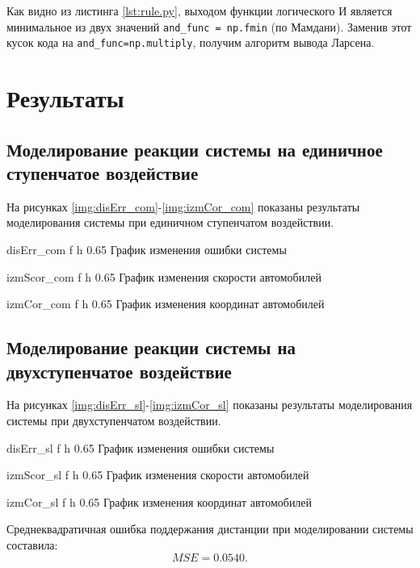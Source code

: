 Как видно из листинга \ref{lst:rule.py}, выходом функции логического И является 
минимальное из двух значений \lstinline|and_func = np.fmin| (по Мамдани).
Заменив этот кусок кода на \lstinline|and_func=np.multiply|, получим алгоритм вывода
Ларсена.

\section{Результаты}

\subsection{Моделирование реакции системы на единичное ступенчатое
 воздействие}

На рисунках \ref{img:disErr_com}-\ref{img:izmCor_com} показаны результаты
 моделирования системы при единичном ступенчатом воздействии.

        {disErr_com}
        {f}
        {h}
        {0.65\textwidth}
        {График изменения ошибки системы}

        {izmScor_com}
        {f}
        {h}
        {0.65\textwidth}
        {График изменения скорости автомобилей}

        
        {izmCor_com}
        {f}
        {h}
        {0.65\textwidth}
        {График изменения координат автомобилей}

\newpage

\subsection{Моделирование реакции системы на двухступенчатое воздействие}

На рисунках \ref{img:disErr_sl}-\ref{img:izmCor_sl} показаны результаты
 моделирования системы при двухступенчатом воздействии.

        {disErr_sl}
        {f}
        {h}
        {0.65\textwidth}
        {График изменения ошибки системы}

        {izmScor_sl}
        {f}
        {h}
        {0.65\textwidth}
        {График изменения скорости автомобилей}

        {izmCor_sl}
        {f}
        {h}
        {0.65\textwidth}
        {График изменения координат автомобилей}

\newpage

Среднеквадратичная ошибка поддержания дистанции при моделировании системы составила:
\[
MSE = 0.0540.
\]

